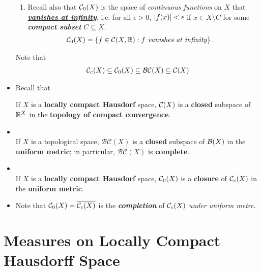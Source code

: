 \documentclass[11pt]{article}
\begin{document}
\begin{itemize}
\begin{definition}
\begin{enumerate}
\item Recall also that ${\mathcal C}_{0}(X)$ is the space of \emph{continuous functions} on $X$ that \underline{\emph{\textbf{vanishes at infinity}}}, i.e. for all $\epsilon >0$, $\left\lvert f(x) \right\rvert < \epsilon$ if $x \in X\setminus C$ for some \emph{\textbf{compact subset}} $C \subseteq X$.
\begin{align*}
{\mathcal C}_{0}(X) &= \left\{f \in {\mathcal C}(X, {\mathbb R}): f \text{\emph{ vanishes at infinity}}\right\}.
\end{align*} 
\end{enumerate}
Note that 
\begin{align*}
{\mathcal C}_{c}(X)  \subseteq {\mathcal C}_{0}(X) \subseteq \mathcal{BC}(X) \subseteq {\mathcal C}(X)
\end{align*}
\end{definition}

\item Recall that 
\begin{proposition}
If $X$ is a \textbf{locally compact Hausdorf} space, ${\mathcal C}(X)$ is a \textbf{closed} subspace of ${\mathbb R}^{X}$ in the \textbf{topology of compact convergence}.
\end{proposition}

\item \begin{proposition} \citep{folland2013real}\\
If $X$ is a topological space, $\mathcal{BC}(X)$ is a \textbf{closed} subspace of ${\mathcal B}(X)$ in the \textbf{uniform metric}; in particular, $\mathcal{BC}(X)$ is \textbf{complete}.
\end{proposition}

\item \begin{proposition}\citep{folland2013real}\\
If $X$ is a \textbf{locally compact Hausdorf} space, ${\mathcal C}_{0}(X)$ is a \textbf{closure} of ${\mathcal C}_{c}(X)$ in the \textbf{uniform metric}.
\end{proposition}

\item \begin{remark}
Note that ${\mathcal C}_0(X) = \overline{{\mathcal C}_c(X)}$ is the \emph{\textbf{completion}} of ${\mathcal C}_c(X)$ \emph{under uniform metrc}.
\end{remark}
\end{itemize}

\section{Measures on Locally Compact Hausdorff Space}
\end{document}
